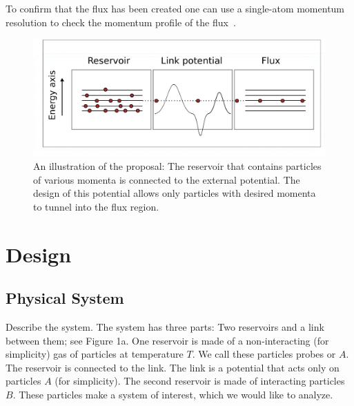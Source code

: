 \documentclass[twocolumn,amsmath,amssymb,showpacs,prl,superscriptaddress,aps]{revtex4-1}
\begin{document}
To confirm that the flux has been created one can use a single-atom momentum resolution to check the momentum profile of the flux~\cite{jochim2018}. 




\begin{figure}
\centerline{\includegraphics[scale=0.3]{figure1new.pdf}}
\caption{An illustration of the proposal: The reservoir that contains particles of various momenta is connected to the external potential. The design of this potential
allows only particles with desired momenta to tunnel into the flux region.
  }
\label{fig:Figure1}
\end{figure}



\section{Design}

\subsection{Physical System}
Describe the system. The system has three parts: Two reservoirs and a link between them; see Figure 1a. One reservoir is made of a non-interacting (for simplicity) gas of particles at temperature $T$. We call these particles probes or $A$. The reservoir is connected to the link. The link is a potential that acts only on particles $A$ (for simplicity). The second reservoir is made of interacting particles $B$. These particles make a system of interest, which we would like to analyze. 
\end{document}
